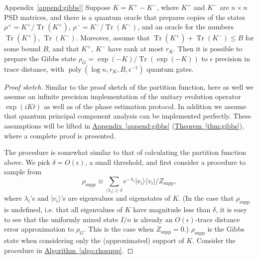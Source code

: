 \documentclass[a4paper,UKenglish,cleveref, autoref]{lipics-v2019}
\theoremstyle{remark}
\numberwithin{equation}{section}
\numberwithin{oracle}{section}
\numberwithin{remark}{section}
\newcommand{\thm}[1]{\hyperref[thm:#1]{Theorem~\ref*{thm:#1}}}
\newcommand{\algo}[1]{\hyperref[algo:#1]{Algorithm~\ref*{algo:#1}}}
\newcommand{\append}[1]{\hyperref[append:#1]{Appendix~\ref*{append:#1}}}
\newcommand{\ket}[1]{|#1\rangle}
\newcommand{\bra}[1]{\langle#1|}
\DeclareMathOperator{\poly}{poly}
\DeclareMathOperator{\tr}{Tr}
\begin{document}
\begin{theorem}[Full proof deferred to \append{gibbs}]\label{thm:low-rank-Gibbs}
Suppose $K = K^+ - K^-$, where $K^+$ and $K^-$ are $n \times n$ PSD matrices, and there is a quantum oracle that prepares copies of the states $\rho^+=K^+ / \tr(K^+)$, $\rho^- = K^-/ \tr(K^-)$, and an oracle for the numbers $\tr(K^+)$, $\tr(K^-)$. Moreover, assume that $\tr(K^+) + \tr(K^-) \le B$ for some bound $B$, and that $K^+$, $K^-$ have rank at most $r_{K}$. Then it is possible to prepare the Gibbs state $\rho_G=\exp(-K)/\tr(\exp(-K))$ to $\epsilon$ precision in trace distance, with $\poly(\log n, r_{K}, B, \epsilon^{-1})$ quantum gates.
\end{theorem}

\begin{proof}[Proof sketch]
Similar to the proof sketch of the partition function, here as well we assume an infinite precision implementation of the unitary evolution operator $\exp(iKt)$ as well as  of the phase estimation protocol. In addition we assume that quantum principal component analysis can be implemented perfectly.  These assumptions will be lifted in \append{gibbs} (\thm{gibbs}), where a complete proof is presented.

The procedure is somewhat similar to that of calculating the partition function above. We pick $\delta = O(\epsilon)$, a small threshold, and first consider a procedure to sample from
\begin{equation}
\rho_{\text{supp}} \equiv \sum_{|\lambda_i| \ge \delta} e^{-\lambda_i}\ket{v_i}\bra{v_i}/Z_{\text{supp}},
\end{equation}
where $\lambda_i$'s and $\ket{v_i}$'s are eigenvalues and eigenstates of $K$. (In the case that $\rho_{\text{supp}}$ is undefined, i.e. that all eigenvalues of $K$ have magnitude less than $\delta$, it is easy to see that the uniformly mixed state $I/n$ is already an $O(\epsilon)$-trace distance error approximation to $\rho_G$. This is the case when $Z_{\text{supp}} = 0$.)  $\rho_{\text{supp}}$ is the Gibbs state when considering only the (approximated) support of $K$. Consider the procedure in \algo{rhosupp}.


\end{proof}
\end{document}
